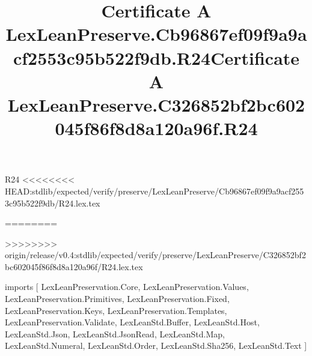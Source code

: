 \begin{lexlean}{R24}
<<<<<<<< HEAD:stdlib/expected/verify/preserve/LexLeanPreserve/Cb96867ef09f9a9acf2553c95b522f9db/R24.lex.tex
\title{Certificate A LexLeanPreserve.Cb96867ef09f9a9acf2553c95b522f9db.R24}
========
\title{Certificate A LexLeanPreserve.C326852bf2bc602045f86f8d8a120a96f.R24}
>>>>>>>> origin/release/v0.4:stdlib/expected/verify/preserve/LexLeanPreserve/C326852bf2bc602045f86f8d8a120a96f/R24.lex.tex
\begin{coremodule}
imports [
  LexLeanPreservation.Core,
  LexLeanPreservation.Values,
  LexLeanPreservation.Primitives,
  LexLeanPreservation.Fixed,
  LexLeanPreservation.Keys,
  LexLeanPreservation.Templates,
  LexLeanPreservation.Validate,
  LexLeanStd.Buffer,
  LexLeanStd.Host,
  LexLeanStd.Json,
  LexLeanStd.JsonRead,
  LexLeanStd.Map,
  LexLeanStd.Numeral,
  LexLeanStd.Order,
  LexLeanStd.Sha256,
  LexLeanStd.Text
]


\end{coremodule}
\end{lexlean}
